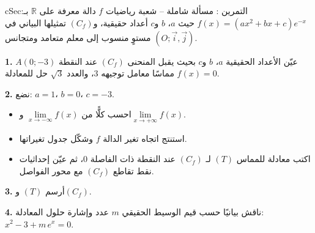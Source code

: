 \documentclass[12pt,a4paper]{article}
\newenvironment{BOX}[2]{\begin{otherlanguage}{english}\begin{arbox}{#1}{#2}}{\end{arbox}\end{otherlanguage}}
\newcounter{exo}
\newenvironment{tamrin}[1]{\stepcounter{exo}\begin{BOX}{cSec}{التمرين \theexo: #1}}{\end{BOX}}
\newcommand{\R}{\mathbb{R}}
\newenvironment{sq}{\begin{itemize}[leftmargin=2.4em,itemsep=3pt]}{\end{itemize}}
\newcommand{\qa}{\item[(أ)]}\newcommand{\qb}{\item[(ب)]}\newcommand{\qc}{\item[(جـ)]}\newcommand{\qd}{\item[(د)]}\newcommand{\qe}{\item[(هـ)]}
\newcommand{\QQ}[1]{\par\smallskip\textbf{#1.} }
\begin{document}
\begin{tamrin}{مسألة شاملة -- شعبة رياضيات}
$f$ دالة معرفة على $\R$ بـ: $f(x)=\left(ax^2+bx+c\right)e^{-x}$ حيث $a$، $b$ و$c$ أعداد حقيقية، و$(C_f)$ تمثيلها البياني في مستوٍ منسوب إلى معلم متعامد ومتجانس $(O;\vec i,\vec j)$.
\QQ{1} عيّن الأعداد الحقيقية $a$، $b$ و$c$ بحيث يقبل المنحنى $(C_f)$ عند النقطة $A(0;-3)$ مماسًا معامل توجيهه $3$، والعدد $\sqrt3$ حل للمعادلة $f(x)=0$.
\QQ{2} نضع: $a=1$، $b=0$، $c=-3$.
\begin{sq}
\qa احسب كلًّا من $\lim\limits_{x\to-\infty}f(x)$ و$\lim\limits_{x\to+\infty}f(x)$.
\qb استنتج اتجاه تغير الدالة $f$ وشكّل جدول تغيراتها.
\qc اكتب معادلة للمماس $(T)$ لـ $(C_f)$ عند النقطة ذات الفاصلة $0$، ثم عيّن إحداثيات نقط تقاطع $(C_f)$ مع محور الفواصل.
\end{sq}
\QQ{3} أرسم $(T)$ و$(C_f)$.
\QQ{4} ناقش بيانيًا حسب قيم الوسيط الحقيقي $m$ عدد وإشارة حلول المعادلة: $x^2-3+m\,e^{x}=0$.
\end{tamrin}
\end{document}
